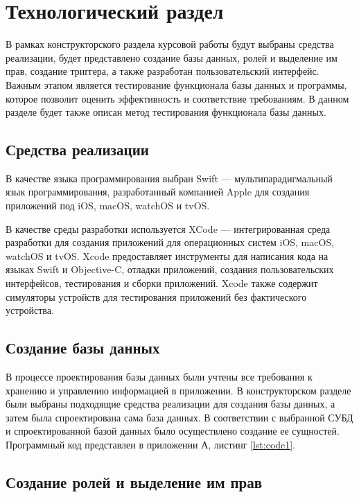 \section{Технологический раздел} \label{tech}

В рамках конструкторского раздела курсовой работы будут выбраны средства реализации, будет представлено создание базы данных, ролей и выделение им прав, создание триггера, а также разработан пользовательский интерфейс. Важным этапом является тестирование функционала базы данных и программы, которое позволит оценить эффективность и соответствие требованиям. В данном разделе будет также описан метод тестирования функционала базы данных. 

\subsection{Средства реализации}

В качестве языка программирования выбран Swift \cite{swift} --- мультипарадигмальный язык программирования, разработанный компанией Apple \cite{apple} для создания приложений под iOS, macOS, watchOS и tvOS. 

В качестве среды разработки используется XCode \cite{xcode} --- интегрированная среда разработки для создания приложений для операционных систем iOS, macOS, watchOS и tvOS. Xcode предоставляет инструменты для написания кода на языках Swift и Objective-C, отладки приложений, создания пользовательских интерфейсов, тестирования и сборки приложений. Xcode также содержит симуляторы устройств для тестирования приложений без фактического устройства.

\subsection{Создание базы данных}

В процессе проектирования базы данных были учтены все требования к хранению и управлению информацией в приложении. В конструкторском разделе были выбраны подходящие средства реализации для создания базы данных, а затем была спроектирована сама база данных. В соответствии с выбранной СУБД и спроектированной базой данных было осуществлено создание ее сущностей. Программный код представлен в приложении А, листинг \ref{lst:code1}. 
 
\subsection{Создание ролей и выделение им прав}

